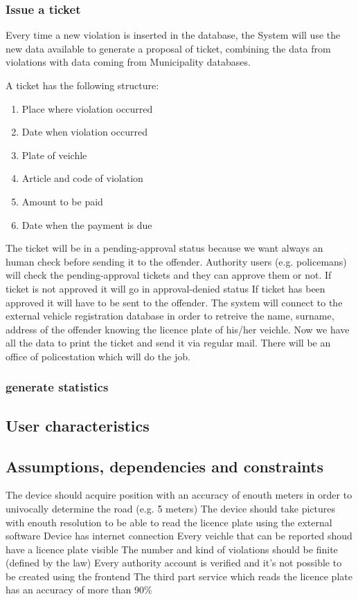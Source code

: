 \subsubsection{Issue a ticket }
Every time a new violation is inserted in the database, the System will use the new data available to generate a proposal of ticket, combining the data from violations with data coming from Municipality databases.

A ticket has the following structure:
\begin{enumerate}
  \item Place where violation occurred
  \item Date when violation occurred
  \item Plate of veichle
  \item Article and code of violation
  \item Amount to be paid
  \item Date when the payment is due
\end{enumerate}

The ticket will be in a pending-approval status because we want always an human check before sending it to the offender.
Authority users (e.g. policemans) will check the pending-approval tickets and they can approve them or not.
If ticket is not approved it will go in approval-denied status
If ticket has been approved it will have to be sent to the offender.
The system will connect to the external vehicle registration database in order to retreive the name, surname, address of the offender knowing the licence plate of his/her veichle.
Now we have all the data to print the ticket and send it via regular mail. There will be an office of policestation which will do the job.

\subsubsection{generate statistics}

\subsection{User characteristics }


\subsection{Assumptions, dependencies and constraints}
\begin{enumerate}
 The device should acquire position with an accuracy of enouth meters in order to univocally determine the road (e.g. 5 meters)
 The device should take pictures with enouth resolution to be able to read the licence plate using the external software
\dom{}  Device has internet connection
 Every veichle that can be reported shoud have a licence plate visible
 The number and kind of violations should be finite (defined by the law)
 Every authority account is verified and it's not possible to be created using the frontend
 The third part service which reads the licence plate has an accuracy of more than 90\%

\end{enumerate}


